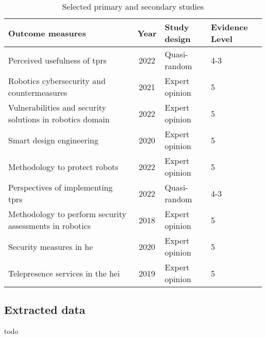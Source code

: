 \begin{table}[h!]
  \centering
  \smaller
  \caption{Selected primary and secondary studies}
  \label{tab:studies}
  \begin{tabularx}{\columnwidth}{lcll}
    \toprule
    \textbf{Outcome measures}                                                                       & \textbf{Year} & \textbf{Study design} & \textbf{Evidence Level} \\
    \midrule
    Perceived usefulness of \ac{tprs}~\cite[]{acceptance-telepresence-robots-2022}                  & 2022          & Quasi-random          & 4-3                     \\
    Robotics cybersecurity and countermeasures~\cite[]{cyber_security_issues_in_robotics_2021}                                     & 2021          & Expert opinion        & 5                       \\
    Vulnerabilities and security solutions in robotics domain~\cite[]{robotics_cyber_security_2022}                                  & 2022& Expert opinion& 5                       \\
    Smart design engineering~\cite[]{smart_design_engineering_2020}                                 & 2020          & Expert opinion& 5                       \\
    Methodology to protect robots~\cite[]{robot_security_review_2022}                               & 2022          & Expert opinion& 5                       \\
    Perspectives of implementing \ac{tprs}~\cite[]{higher_edu_perception_on_tprs_2022}                                                         & 2022          & Quasi-random          & 4-3                     \\
    Methodology to perform security assessments in robotics~\cite[]{robot_security_framework_2018}                                         & 2018          & Expert opinion& 5                       \\
    Security measures in \ac{he}~\cite[]{role_of_cyber_security_in_higher_edu_2020}                 & 2020          & Expert opinion& 5                       \\
    Telepresence services in the \ac{hei}~\cite[]{telepresence_robots_in_classroom_2019}                                                           & 2019          & Expert opinion& 5                       \\
    \bottomrule
  \end{tabularx}
\end{table}

\subsection{Extracted data}\label{subsec:extracted-data}

todo
